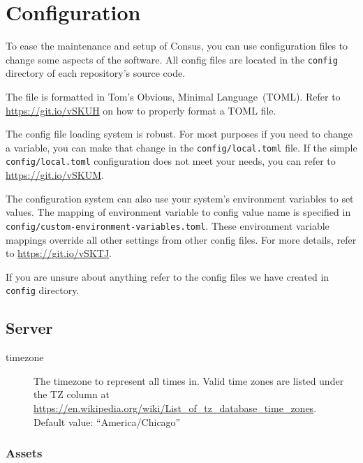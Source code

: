 \section{Configuration}
\label{sec:config}

To ease the maintenance and setup of Consus, you can use configuration files to change some aspects of the software.
All config files are located in the \texttt{config} directory of each repository's source code.

The file is formatted in Tom's Obvious, Minimal Language~(TOML).
Refer to \url{https://git.io/vSKUH} on how to properly format a TOML file.

The config file loading system is robust.
For most purposes if you need to change a variable, you can make that change in the \texttt{config/local.toml} file.
If the simple \texttt{config/local.toml} configuration does not meet your needs, you can refer to \url{https://git.io/vSKUM}.


The configuration system can also use your system's environment variables to set values.
The mapping of environment variable to config value name is specified in \texttt{config/custom-environment-variables.toml}.
These environment variable mappings override all other settings from other config files.
For more details, refer to \url{https://git.io/vSKTJ}.

If you are unsure about anything refer to the config files we have created in \texttt{config} directory.

\subsection{Server}
\label{subsec:server_config}

\begin{description}
  \item[timezone] The timezone to represent all times in.
    Valid time zones are listed under the TZ column at \url{https://en.wikipedia.org/wiki/List_of_tz_database_time_zones}.\\
    Default value: ``America/Chicago''
\end{description}

\subsubsection{Assets}
\label{subsubsec:server_config_assets}

